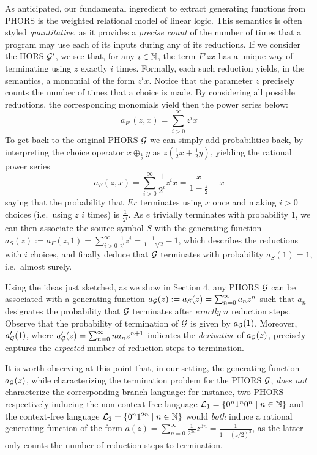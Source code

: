 As anticipated, our fundamental ingredient to extract generating functions from PHORS is the weighted relational model of linear logic. This semantics is often styled \emph{quantitative}, as it provides a \emph{precise count} of the number of times that a program may use each of its inputs during any of its reductions.
If we consider the HORS $\mathcal{G}'$, we see that, for any $i\in \mathbb{N}$, the term $F'zx$ has a unique way of terminating using $z$ exactly $i$ times. Formally, each such reduction yields, in the semantics, a monomial of the form $z^{i}x$. Notice that the parameter $z$ precisely counts the number of times that a choice is made.
By considering all possible reductions, the corresponding monomials yield then the power series below:
\[
a_{F'}(z,x)=\sum_{i>0}^{\infty}z^i x
\]
To get back to the original PHORS $\mathcal{G}$ we can simply add probabilities back, by interpreting 
the choice operator
 $x\oplus_{\frac{1}{2}}y$ as $z(\frac{1}{2}x+\frac{1}{2}y)$, yielding the rational power series
%
\[
a_{F}(z,x)=\sum_{i>0}^{\infty}\frac{1}{2^i}z^i x=\frac{x}{1-\frac{z}{2}}-x
\]
saying that the probability that $Fx$ terminates using $x$ once and making $i>0$ choices (i.e.~using $z$ $i$ times) is $\frac{1}{2^i}$. 
As $e$ trivially terminates with probability 1, we can then associate the source symbol $S$ with the generating function
$a_{S}(z):=a_{F}(z,1)=\sum_{i>0}^{\infty}\frac{1}{2^i}z^i=\frac{1}{1-z/2}-1$,
which describes the reductions with $i$ choices, and finally deduce that $\mathcal{G}$ terminates with probability $a_{S}(1)=1$, i.e.~almost surely. 



Using the ideas just sketched, as we show in Section 4, any PHORS $\mathcal{G}$ can be associated with a generating function 
$
a_{\mathcal{G}}(z):=a_{S}(z)=\sum_{n=0}^\infty a_n z^n
$
such that $a_n$ designates the probability that $\mathcal{G}$ terminates after \emph{exactly} $n$ reduction steps. Observe that the probability of termination of $\mathcal{G}$ is given by $a_{\mathcal{G}}(1)$. Moreover, $a'_{\mathcal{G}}(1)$, where
$a'_{\mathcal{G}}(z)=\sum_{n=0}^{\infty}na_n z^{n+1}$ indicates 
the \emph{derivative} of $a_{\mathcal{G}}(z)$, precisely captures the \emph{expected} number of reduction steps to termination. 


It is worth observing at this point that, in our setting, the generating function $a_{\mathcal{G}}(z)$, while characterizing the termination problem for the PHORS $\mathcal{G}$,  \emph{does not} characterize the corresponding branch language: for instance, two PHORS respectively inducing the non context-free language $\mathcal{L}_1=\{0^n1^n0^n\mid n\in \mathbb{N}\}$ and the context-free language 
$\mathcal{L}_2=\{0^n1^{2n}\mid n\in \mathbb{N}\}$ would \emph{both} induce a rational generating function of the form $a(z)=\sum_{n=0}^{\infty}\frac{1}{2^{3n}}z^{3n}=\frac{1}{1-\left({z}/{2}\right)^3}$, as the latter only counts the number of reduction steps to termination. 




